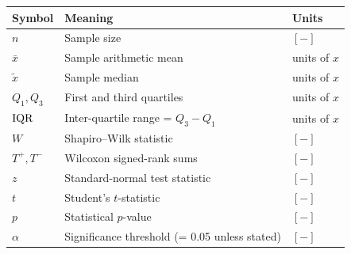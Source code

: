 {\small
\renewcommand{\arraystretch}{1.12}
\begin{tabular}{@{}p{}p{}p{}@{}}
\toprule
\rowcolor{tablehdr}
{\color{white}\textbf{Symbol}} & {\color{white}\textbf{Meaning}} & {\color{white}\textbf{Units}}\\
\midrule
$n$            & Sample size                                          & $[-]$ \\
$\bar{x}$      & Sample arithmetic mean                               & units of $x$ \\
$\widetilde{x}$& Sample median                                        & units of $x$ \\
$Q_1, Q_3$     & First and third quartiles                            & units of $x$ \\
$\mathrm{IQR}$         & Inter-quartile range = $Q_3 - Q_1$                   & units of $x$ \\
$W$            & Shapiro--Wilk statistic                              & $[-]$ \\
$T^+, T^-$     & Wilcoxon signed-rank sums                            & $[-]$ \\
$z$            & Standard-normal test statistic                       & $[-]$ \\
$t$            & Student's $t$-statistic                              & $[-]$ \\
$p$            & Statistical $p$-value                                & $[-]$ \\
$\alpha$       & Significance threshold (= 0.05 unless stated)        & $[-]$ \\
\bottomrule
\end{tabular}}
